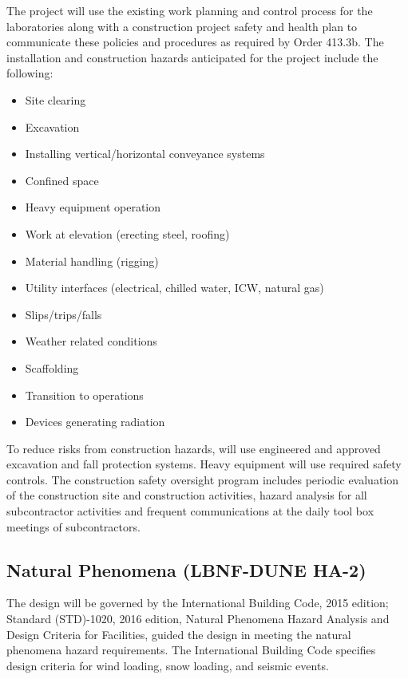 The project will use the existing work planning and
control process for the laboratories along with a construction project safety and health
plan to communicate these policies and procedures as required by 
Order 413.3b. The installation and construction hazards
anticipated for the  project include the following:
\begin{itemize}
 \item Site clearing
 \item Excavation
 \item Installing vertical/horizontal conveyance systems
 \item Confined space
 \item Heavy equipment operation
 \item Work at elevation (erecting steel, roofing)
 \item Material handling (rigging)
 \item Utility interfaces (electrical, chilled water, ICW, natural gas)
 \item Slips/trips/falls
 \item Weather related conditions
 \item Scaffolding
 \item Transition to operations
 \item Devices generating radiation
\end{itemize}

To reduce risks from construction hazards, \fnal will use engineered
and approved excavation and fall protection systems.  Heavy equipment
will use required safety controls. The \fnal construction safety
oversight program includes periodic evaluation of the construction
site and construction activities, hazard analysis for all
subcontractor activities and frequent  communications at
the daily tool box meetings of subcontractors.

\subsection{Natural Phenomena (LBNF-DUNE HA-2)}

The  design will be governed by the
International Building Code, 2015 edition;  Standard
(STD)-1020, 2016 edition, Natural Phenomena Hazard Analysis and Design
Criteria for  Facilities, guided the design in meeting the
natural phenomena hazard requirements.  The International Building
Code specifies design criteria for wind loading, snow loading, and
seismic events.

